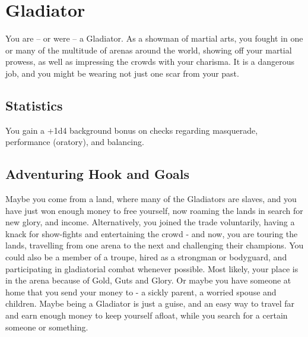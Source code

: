 \section{Gladiator}\label{background:gladiator}
You are -- or were -- a Gladiator.
As a showman of martial arts, you fought in one or many of the multitude of arenas around the world, showing off your martial prowess, as well as impressing the crowds with your charisma.
It is a dangerous job, and you might be wearing not just one scar from your past.

\subsection{Statistics}
You gain a +1d4 background bonus on checks regarding masquerade, performance (oratory), and balancing.

\subsection{Adventuring Hook and Goals}
Maybe you come from a land, where many of the Gladiators are slaves, and you have just won enough money to free yourself, now roaming the lands in search for new glory, and income.
Alternatively, you joined the trade voluntarily, having a knack for show-fights and entertaining the crowd - and now, you are touring the lands, travelling from one arena to the next and challenging their champions.
You could also be a member of a troupe, hired as a strongman or bodyguard, and participating in gladiatorial combat whenever possible.
Most likely, your place is in the arena because of Gold, Guts and Glory.
Or maybe you have someone at home that you send your money to - a sickly parent, a worried spouse and children.
Maybe being a Gladiator is just a guise, and an easy way to travel far and earn enough money to keep yourself afloat, while you search for a certain someone or something.
